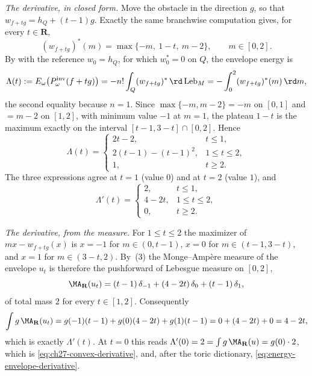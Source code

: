 \begin{example}
\emph{The derivative, in closed form.}  Move the obstacle in the direction
$g$, so that $w_{f+tg}=h_Q+(t-1)g$.  Exactly the same branchwise
computation gives, for every $t\in\mathbf R$,
\[
 (w_{f+tg})^*(m)=\max\{-m,\ 1-t,\ m-2\},
 \qquad m\in[0,2].
\]
By  with the reference $w_0=h_Q$, for which
$w_0^*=0$ on $Q$, the envelope energy is
\[
 \Lambda(t):=E_\omega\bigl(P^{\mathrm{inv}}_\omega(f+tg)\bigr)
 =-n!\int_Q(w_{f+tg})^*\,\rd\operatorname{Leb}_M
 =-\int_0^2(w_{f+tg})^*(m)\,\rd m ,
\]
the second equality because $n=1$.
Since $\max\{-m,m-2\}=-m$ on $[0,1]$ and $=m-2$ on $[1,2]$, with
minimum value $-1$ at $m=1$, the plateau $1-t$ is the maximum exactly
on the interval $[t-1,3-t]\cap[0,2]$.  Hence
\[
 \Lambda(t)=
 \begin{cases}
  2t-2, & t\leq1,\\[2pt]
  2(t-1)-(t-1)^2, & 1\leq t\leq2,\\[2pt]
  1, & t\geq2 .
 \end{cases}
\]
The three expressions agree at $t=1$ (value $0$) and at $t=2$ (value
$1$), and
\[
 \Lambda'(t)=
 \begin{cases}
  2,& t\leq1,\\
  4-2t,& 1\leq t\leq2,\\
  0,& t\geq2 .
 \end{cases}
\]

\emph{The derivative, from the measure.}  For $1\leq t\leq2$ the
maximizer of $mx-w_{f+tg}(x)$ is $x=-1$ for $m\in(0,t-1)$, $x=0$ for
$m\in(t-1,3-t)$, and $x=1$ for $m\in(3-t,2)$.  By
\,(3) the Monge--Amp\`ere measure of
the envelope $u_t$ is therefore the pushforward of Lebesgue measure on
$[0,2]$,
\[
 \MA_{\mathbf R}(u_t)
 =(t-1)\,\delta_{-1}+(4-2t)\,\delta_0+(t-1)\,\delta_1,
\]
of total mass $2$ for every $t\in[1,2]$.  Consequently
\[
 \int g\,\MA_{\mathbf R}(u_t)
 =g(-1)(t-1)+g(0)(4-2t)+g(1)(t-1)
 =0+(4-2t)+0=4-2t,
\]
which is exactly $\Lambda'(t)$.  At $t=0$ this reads
$\Lambda'(0)=2=\int g\,\MA_{\mathbf R}(u)=g(0)\cdot2$, which is
\eqref{eq:ch27-convex-derivative}, and, after the toric dictionary,
\eqref{eq:energy-envelope-derivative}.


\end{example}
